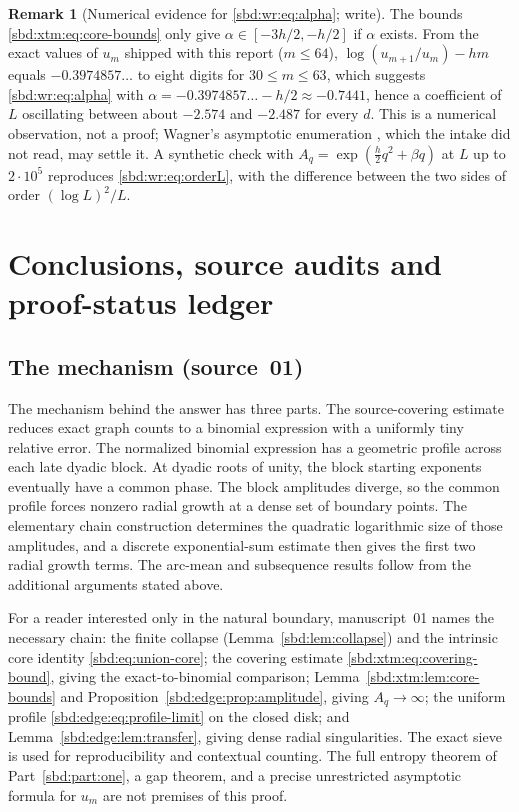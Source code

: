 \documentclass[11pt,a4paper]{article}
\theoremstyle{definition}
\newtheorem{remark}[theorem]{Remark}
\begin{document}
\begin{remark}[Numerical evidence for \eqref{sbd:wr:eq:alpha}; write]\label{sbd:wr:rem:alpha}
The bounds \eqref{sbd:xtm:eq:core-bounds} only give $\alpha\in[-3h/2,-h/2]$
if $\alpha$ exists. From the exact values of $u_m$ shipped with this report
($m\le64$), $\log(u_{m+1}/u_m)-hm$ equals $-0.3974857\ldots$ to eight digits
for $30\le m\le63$, which suggests \eqref{sbd:wr:eq:alpha} with
$\alpha=-0.3974857\ldots-h/2\approx-0.7441$, hence a coefficient of $L$
oscillating between about $-2.574$ and $-2.487$ for every $d$. This is a
numerical observation, not a proof; Wagner's asymptotic enumeration
\cite{wagner,wagner13}, which the intake did not read, may settle it. A
synthetic check with $A_q=\exp(\tfrac h2q^2+\beta q)$ at $L$ up to $2\cdot10^5$
reproduces \eqref{sbd:wr:eq:orderL}, with the difference between the two
sides of order $(\log L)^2/L$.
\end{remark}

\section{Conclusions, source audits and proof-status ledger}
\label{sbd:xtm:app:audit}

\subsection{The mechanism (source~01)}
The mechanism behind the answer has three parts. The source-covering
estimate reduces exact graph counts to a binomial expression with a
uniformly tiny relative error. The normalized binomial expression has a
geometric profile across each late dyadic block. At dyadic roots of unity,
the block starting exponents eventually have a common phase. The block
amplitudes diverge, so the common profile forces nonzero radial growth at a
dense set of boundary points. The elementary chain construction determines
the quadratic logarithmic size of those amplitudes, and a discrete
exponential-sum estimate then gives the first two radial growth terms. The
arc-mean and subsequence results follow from the additional arguments
stated above.

For a reader interested only in the natural boundary, manuscript~01 names
the necessary chain: the finite collapse (Lemma~\ref{sbd:lem:collapse}) and
the intrinsic core identity \eqref{sbd:eq:union-core}; the covering estimate
\eqref{sbd:xtm:eq:covering-bound}, giving the exact-to-binomial comparison;
Lemma~\ref{sbd:xtm:lem:core-bounds} and
Proposition~\ref{sbd:edge:prop:amplitude}, giving $A_q\to\infty$; the
uniform profile \eqref{sbd:edge:eq:profile-limit} on the closed disk; and
Lemma~\ref{sbd:edge:lem:transfer}, giving dense radial singularities. The
exact sieve is used for reproducibility and contextual counting. The full
entropy theorem of Part~\ref{sbd:part:one}, a gap theorem, and a precise
unrestricted asymptotic formula for $u_m$ are not premises of this proof.
\end{document}
